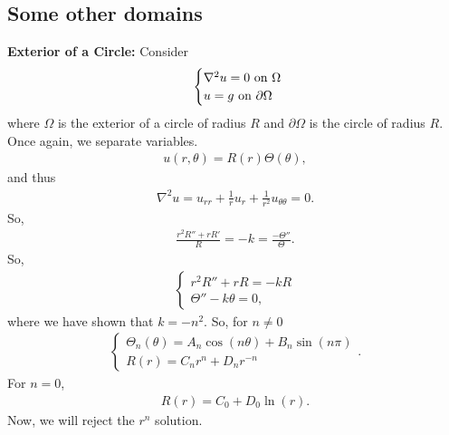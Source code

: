 \documentclass{article}
\theoremstyle{definition}
\newcommand{\p}{\partial}
\newcommand{\f}[2]{\frac{#1}{#2}}
\begin{document}
\subsection{Some other domains}

\textbf{Exterior of a Circle:} Consider
\begin{align*}
\hspace{0.5cm}\begin{cases}
\nabla^2 u = 0 \text{ on }\Omega\\
u=g \text{ on $\p\Omega$}
\end{cases}
\end{align*}
where $\Omega$ is the exterior of a circle of radius $R$ and $\p\Omega$ is the circle of radius $R$. Once again, we separate variables.
\begin{align*}
u(r,\theta) = R(r)\Theta(\theta),
\end{align*}
and thus
\begin{align*}
\nabla^2 u = u_{rr} + \f{1}{r}u_r + \f{1}{r^2}u_{\theta\theta} = 0.
\end{align*}
So,
\begin{align*}
\f{r^2R'' + rR'}{R} = -k = \f{-\Theta''}{\Theta}.
\end{align*}
So,
\begin{align*}
\begin{cases}
r^2R'' + rR = -kR\\
\Theta'' - k\theta = 0,
\end{cases}
\end{align*}
where we have shown that $k = -n^2$. So, for $n\neq 0$
\begin{align*}
\begin{cases}
\Theta_n(\theta) = A_n\cos(n\theta) + B_n\sin(n\pi)\\
R(r) = C_nr^n + D_nr^{-n}
\end{cases}.
\end{align*}
For $n=0$, 
\begin{align*}
R(r) = C_0+D_0\ln(r).
\end{align*}
Now, we will reject the $r^n$ solution.
\end{document}
